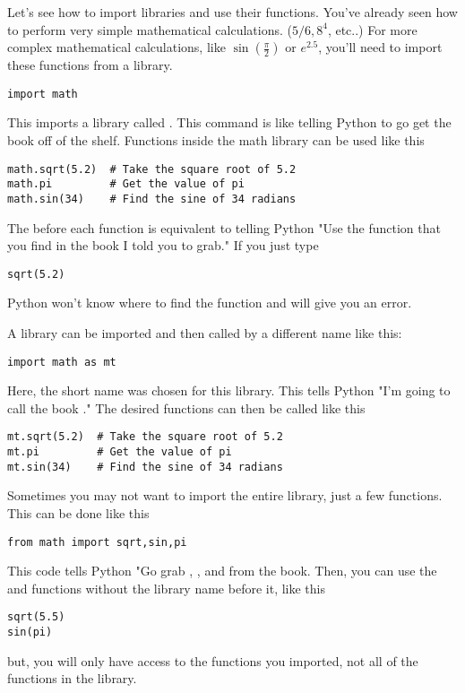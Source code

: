 Let's see how to import libraries and use their functions. You've
already seen how to perform very simple mathematical calculations. ($5/6, 8^4$,
etc..)  For more complex
mathematical calculations, like $\sin(\frac{\pi}{2})$ or $e^{2.5}$,
you'll need to import these functions from a library.
\begin{Verbatim}
import math
\end{Verbatim}
This imports a library called .  This command is like telling Python to go get the  book off of the shelf.  Functions inside the
math library can be used like this
\begin{Verbatim}
math.sqrt(5.2)  # Take the square root of 5.2
math.pi         # Get the value of pi
math.sin(34)    # Find the sine of 34 radians
\end{Verbatim}
The  before each function is equivalent to telling Python "Use the  function that you find in the  book I told you to grab." If you just type
\begin{Verbatim}
sqrt(5.2)
\end{Verbatim}
Python won't know where to find the  function and will give you an error.



A library can be imported and then called by a different name like
this:
\begin{Verbatim}
import math as mt
\end{Verbatim}
Here, the short name  was chosen for this library.  This tells Python "I'm going to call the  book ."
The desired functions can then be called like this
\begin{Verbatim}
mt.sqrt(5.2)  # Take the square root of 5.2
mt.pi         # Get the value of pi
mt.sin(34)    # Find the sine of 34 radians
\end{Verbatim}

Sometimes you may not want to import the entire library, just a few
functions. This can be done like this
\begin{Verbatim}
from math import sqrt,sin,pi
\end{Verbatim}
This code tells Python "Go grab , , and  from the  book.  Then, you can use the  and  functions
without the library name before it, like this
\begin{Verbatim}
sqrt(5.5)
sin(pi)
\end{Verbatim}
but, you will only have access to the functions you imported, not all of the functions in the  library.

